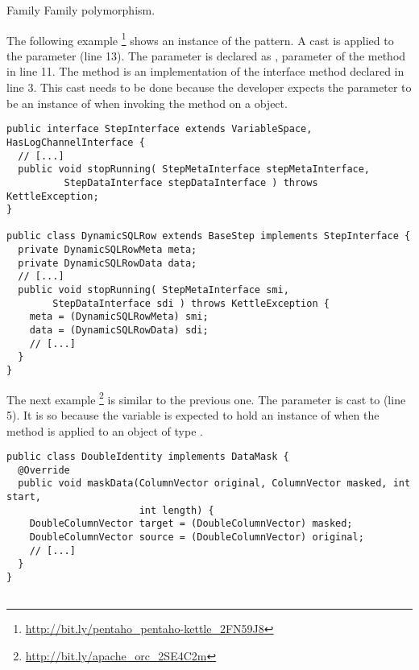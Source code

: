 \begin{pattern}{Family}
Family polymorphism.

\instances{}
The following example%
\footnote{\url{http://bit.ly/pentaho_pentaho-kettle_2FN59J8}}
shows an instance of the \thisp{} pattern.
%
%
A cast is applied to the parameter  (line 13).
The  parameter is declared as , parameter of the  method in line 11.
The  method is an implementation of the interface method declared in line 3.
%
%
This cast needs to be done because the developer expects the  parameter to be an instance of  when invoking the  method on a  object.

\begin{verbatim}
public interface StepInterface extends VariableSpace, HasLogChannelInterface {
  // [...]
  public void stopRunning( StepMetaInterface stepMetaInterface,
          StepDataInterface stepDataInterface ) throws KettleException;
}

public class DynamicSQLRow extends BaseStep implements StepInterface {
  private DynamicSQLRowMeta meta;
  private DynamicSQLRowData data;
  // [...]
  public void stopRunning( StepMetaInterface smi,
        StepDataInterface sdi ) throws KettleException {
    meta = (DynamicSQLRowMeta) smi;
    data = (DynamicSQLRowData) sdi;
    // [...]
  }
}
\end{verbatim}

The next example%
\footnote{\url{http://bit.ly/apache_orc_2SE4C2m}}
is similar to the previous one.
The  parameter is cast to  (line 5).
It is so because the  variable is expected to hold an instance of  when the  method is applied to an object of type .

\begin{verbatim}
public class DoubleIdentity implements DataMask {
  @Override
  public void maskData(ColumnVector original, ColumnVector masked, int start,
                       int length) {
    DoubleColumnVector target = (DoubleColumnVector) masked;
    DoubleColumnVector source = (DoubleColumnVector) original;
    // [...]
  }
}


\end{verbatim}
\end{pattern}
